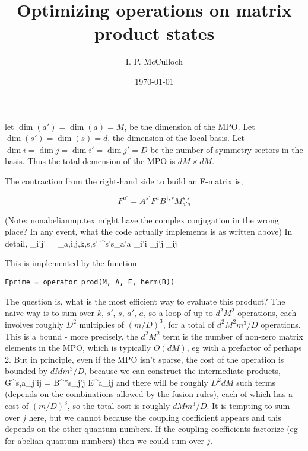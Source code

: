 \documentclass{article}[10pt]
\begin{document}
\title{Optimizing operations on matrix product states}

\author{I. P. McCulloch}
\date{\today}

\maketitle

let $\dim(a') = \dim(a) = M$, be the dimension of the MPO. Let $\dim(s') = \dim(s) = d$, the dimension
of the local basis. Let $\dim{i} = \dim{j} = \dim{i'} = \dim{j'} = D$ be the number of symmetry sectors
in the basis. Thus the total demension of the MPO is $dM \times dM$.

The contraction from the right-hand side to build an F-matrix is,

\begin{equation}
F^{a'} = A^{s'} F^a B^{\dagger,s} M^{s's}_{a'a}
\end{equation}

(Note: nonabelianmp.tex might have the complex conjugation in the wrong place? In any event,
what the code actually implements is as written above) In detail, 
\beq
{}_{i'j'} =
\sum_{a,i,j,k,s,s'}
^{s's}_{a'a} _{i'i} _{j'j} 
_{ij}
\eeq

This is implemented by the function 
\begin{verbatim}Fprime = operator_prod(M, A, F, herm(B))\end{verbatim}

The question is, what is the most efficient way to evaluate this product? The naive way is to sum over
$k$, $s'$, $s$, $a'$, $a$, so a loop of up to $d^2 M^2$ operations, each involves roughly $D^2$ multiplies
of $(m/D)^3$, for a total of $d^2 M^2 m^3 / D$ operations. This is a bound - more precisely, the
$d^2 M^2$ term is the number of non-zero matrix elements in the MPO, which is typically $O(dM)$, eg with 
a prefactor of perhaps 2. But in principle, even if the MPO isn't sparse, the cost of the operation is bounded
by $d M m^3 / D$, because we can construct the intermediate products,
\beq
G^{s,a}_{j'ij} = B^{*s}_{j'j} E^a_{ij}
\eeq
and there will be roughly $D^2 dM$ such terms (depends on the combinations allowed by the fusion rules), 
each of which has a cost of
$(m/D)^3$, so the total cost is roughly $dM m^3/D$.
It is tempting to sum over $j$ here, but we cannot because the coupling coefficient appears and
this depends on the other quantum numbers. If the coupling coefficients factorize (eg for abelian quantum numbers)
then we could sum over $j$.
\end{document}
